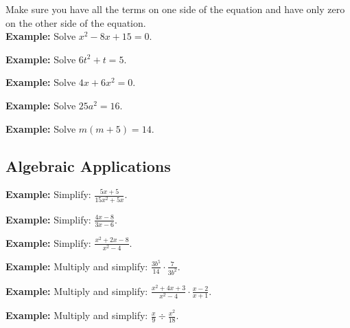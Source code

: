 \documentclass{ximera}
\begin{document}
Make sure you have all the terms on one side of the equation and have only zero on the other side of the equation.\\

{\bf Example:} Solve $x^2 -8x +15 = 0$.\\
\vspace{3 cm}

{\bf Example:} Solve $6t^2 + t = 5$.\\
\vspace{3 cm}

{\bf Example:} Solve $4x + 6x^2 = 0$.\\
\vspace{3 cm}

{\bf Example:} Solve $25a^2 = 16$.\\
\vspace{3 cm}

{\bf Example:} Solve $m(m+5) = 14$.\\
\vspace{3 cm}

\subsection{Algebraic Applications}
{\bf Example:} Simplify: $\displaystyle \frac{5x+5}{15x^2+5x}$.\\

\vspace{3 cm}

{\bf Example:} Simplify: $\displaystyle \frac{4x-8}{3x-6}$.\\

\vspace{3 cm}

{\bf Example:} Simplify: $\displaystyle \frac{x^2+2x-8}{x^2-4}$.\\

\vspace{3 cm}

{\bf Example:} Multiply and simplify: $\displaystyle \frac{3b^5}{14} \cdot \frac{7}{3b^2}$.\\

\vspace{3 cm}

{\bf Example:} Multiply and simplify: $\displaystyle \frac{x^2+4x+3}{x^2-4} \cdot \frac{x-2}{x+1}$.\\

\vspace{4 cm}

{\bf Example:} Multiply and simplify: $\displaystyle \frac{x}{9} \div \frac{x^2}{18}$.\\
\end{document}
